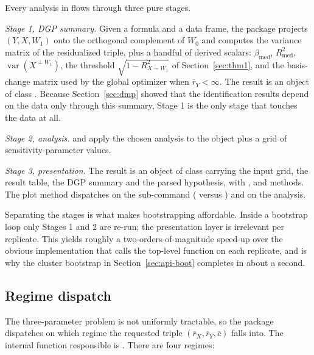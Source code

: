 \documentclass[article]{jss}\usepackage[]{graphicx}\usepackage[]{xcolor}
\newcommand{\bmed}{\beta_{\mathrm{med}}}
\newcommand{\rxbar}{\ensuremath{\overline{r}_X}}
\newcommand{\rybar}{\ensuremath{\overline{r}_Y}}
\newcommand{\cbar}{\ensuremath{\overline{c}}}
\newcommand{\Rsq}[1]{\ensuremath{R^2_{#1}}}
\newcommand{\Var}{\operatorname{var}}
\begin{document}
Every analysis in  flows through three pure stages.

\emph{Stage 1, DGP summary.} Given a formula and a data frame, the package
projects $(Y, X, W_1)$ onto the orthogonal complement of $W_0$ and computes
the variance matrix of the residualized triple, plus a handful of derived
scalars: $\bmed$, $R^2_{\mathrm{med}}$, $\Var(X^{\perp W_1})$, the
threshold $\sqrt{1 - \Rsq{X \sim W_1}}$ of Section~\ref{sec:thm1}, and the
basis-change matrix used by the global optimizer when $\rybar < \infty$.
The result is an object of class . Because
Section~\ref{sec:dmp} showed that the identification results depend on the
data only through this summary, Stage 1 is the only stage that touches the
data at all.

\emph{Stage 2, analysis.}  and
 apply the chosen analysis to the
 object plus a grid of sensitivity-parameter values.

\emph{Stage 3, presentation.} The result is an object of class
 carrying the input grid, the result table, the DGP
summary and the parsed hypothesis, with ,  and
 methods. The plot method dispatches on the sub-command
( versus ) and on the analysis.

Separating the stages is what makes bootstrapping affordable. Inside a
bootstrap loop only Stages 1 and 2 are re-run; the presentation layer is
irrelevant per replicate. This yields roughly a two-orders-of-magnitude
speed-up over the obvious implementation that calls the top-level function
on each replicate, and is why the cluster bootstrap in
Section~\ref{sec:api-boot} completes in about a second.

\subsection{Regime dispatch}\label{sec:regimes}

\sloppypar
The three-parameter problem is not uniformly tractable, so the package
dispatches on which regime the requested triple
$(\rxbar, \rybar, \cbar)$ falls into. The internal function responsible is
. There are four regimes:
\endsloppypar
\end{document}
